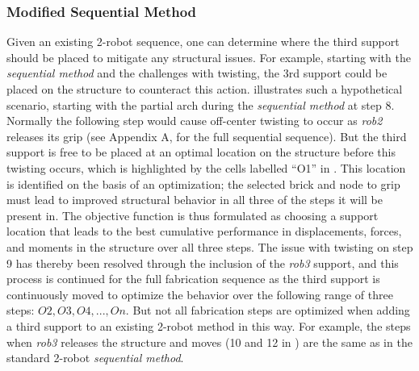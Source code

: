 \subsubsection{Modified Sequential Method}\label{sec:5_3rob_2}
Given an existing 2-robot sequence, one can determine where the third support should be placed to mitigate any structural issues. For example, starting with the \textit{sequential method} and the challenges with twisting, the 3rd support could be placed on the structure to counteract this action.  illustrates such a hypothetical scenario, starting with the partial arch during the \textit{sequential method} at step 8. Normally the following step would cause off-center twisting to occur as \textit{rob2} releases its grip (see Appendix A,  for the full sequential sequence). But the third support is free to be placed at an optimal location on the structure before this twisting occurs, which is highlighted by the cells labelled ``O1'' in . This location is identified on the basis of an optimization; the selected brick and node to grip must lead to improved structural behavior in all three of the steps it will be present in. The objective function is thus formulated as choosing a support location that leads to the best cumulative performance in displacements, forces, and moments in the structure over all three steps. The issue with twisting on step 9 has thereby been resolved through the inclusion of the \textit{rob3} support, and this process is continued for the full fabrication sequence as the third support is continuously moved to optimize the behavior over the following range of three steps: $O2, O3, O4,...,On$. But not all fabrication steps are optimized when adding a third support to an existing 2-robot method in this way. For example, the steps when \textit{rob3} releases the structure and moves (10 and 12 in ) are the same as in the standard 2-robot \textit{sequential method}.


